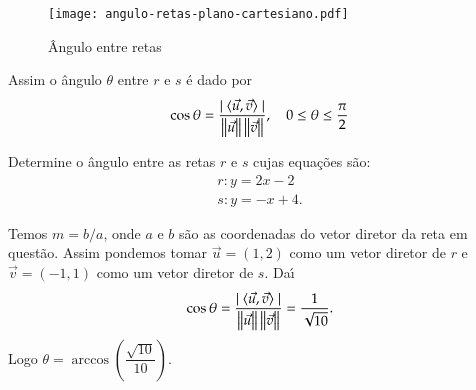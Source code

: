 \begin{figure}[!h]
  \centering
  \caption{\^Angulo entre retas}
  \texttt{[image: angulo-retas-plano-cartesiano.pdf]}



\end{figure}

Assim o \^angulo $\theta$ entre $r$ e $s$ \'e dado por
\[
  \cos\theta = \dfrac{\mid\langle \vec{u}, \vec{v} \rangle\mid}{\left\Vert{\vec{u}}\right\Vert\left\Vert{\vec{v}}\right\Vert},\quad 0 \le \theta \le \dfrac{\pi}{2}
\]

\begin{exemplos}
  Determine o \^angulo entre as retas $r$ e $s$ cujas equa\c{c}\~oes s\~ao:
  \begin{align*}
    r: y = 2x -2\\
    s: y = -x + 4.
  \end{align*}
  \begin{solucao}
    Temos $m = b/a$, onde $a$ e $b$ s\~ao as coordenadas do vetor diretor da reta em quest\~ao. Assim pondemos tomar $\vec{u} = (1,2)$ como um vetor diretor de $r$ e $\vec{v} = (-1,1)$ como um vetor diretor de $s$. Da{\'\i}
    \[
      \cos\theta = \dfrac{\mid\langle \vec{u}, \vec{v} \rangle\mid}{\left\Vert{\vec{u}}\right\Vert\left\Vert{\vec{v}}\right\Vert} = \dfrac{1}{\sqrt{10}}.
    \]
    Logo $\theta = \arccos\left(\dfrac{\sqrt{10}}{10}\right)$.
  \end{solucao}
\end{exemplos}

